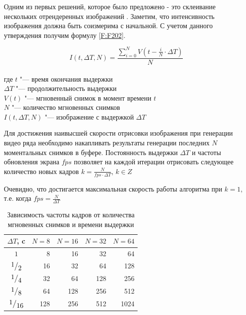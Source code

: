 Одним из первых решений, которое было предложено - это склеивание нескольких отрендеренных изображений   \cite{Haeberli90}. Заметим, что интенсивность изображения должна быть соизмерима с начальной. С учетом данного утверждения получим формулу \eqref{F:F202}.
\begin{eqndesc}
    \begin{equation}\label{F:F202}
        I(t, \Delta T, N) = \frac{ \sum_{i=0}^{N} { V({t - \frac{i}{N} \cdot \Delta T})}}{N}
    \end{equation}
    \\
    где $t$ "--- время окончания выдержки \\
    $\Delta T$ "--- продолжительность выдержки \\
    $V(t)$ "--- мгновенный снимок в момент времени $t$\\
    $N$ "--- количество мгновенных снимков \\
    $I(t, \Delta T, N)$ "--- изображение с выдержкой $\Delta T$
\end{eqndesc}

Для достижения наивысшей скорости отрисовки изображения при генерации видео ряда необходимо накапливать результаты генерации последних $N$ моментальных снимков в буфере. Постоянность выдержки $\Delta T$ и частоты обновления экрана $fps$  позволяет на каждой итерации отрисовать следующее количество новых кадров  $k = \frac{N}{fps \cdot \Delta T}$, $k \in Z$
\par
Очевидно, что достигается максимальная скорость работы алгоритма при $k = 1$, т.е. когда $fps = \frac{N}{\Delta T}$


\begin{table}[ht]
    \caption{Зависимость частоты кадров от количества мгновенных снимков и времени выдержки}
    \begin{tabular}{|c|r|r|r|r|}
        \hline
        $\Delta T$, c & $N = 8$ & $N=16$ & $N=32$ & $N=64$ \\
        \hline
        $1$           & 8      & 16    & 32    & 64    \\
        $\frc{1}{2}$  & 16     & 32    & 64    & 128   \\
        $\frc{1}{4}$  & 32     & 64    & 128   & 256   \\
        $\frc{1}{8}$  & 64     & 128   & 256   & 512   \\
        $\frc{1}{16}$ & 128    & 256   & 512   & 1024  \\
        \hline
    \end{tabular}
    \label{tab:acum_table}
\end{table}

